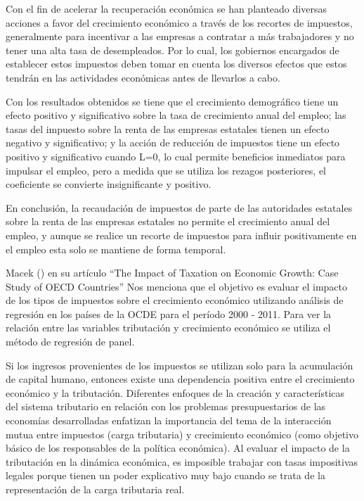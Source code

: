 \documentclass[
  jou,
  floatsintext,
  longtable,
  a4paper,
  nolmodern,
  notxfonts,
  notimes,
  12pt,
  colorlinks=true,linkcolor=blue,citecolor=blue,urlcolor=blue]{apa7}
\begin{document}
Con el fin de acelerar la recuperación económica se han planteado
diversas acciones a favor del crecimiento económico a través de los
recortes de impuestos, generalmente para incentivar a las empresas a
contratar a más trabajadores y no tener una alta tasa de desempleados.
Por lo cual, los gobiernos encargados de establecer estos impuestos
deben tomar en cuenta los diversos efectos que estos tendrán en las
actividades económicas antes de llevarlos a cabo.

Con los resultados obtenidos se tiene que el crecimiento demográfico
tiene un efecto positivo y significativo sobre la tasa de crecimiento
anual del empleo; las tasas del impuesto sobre la renta de las empresas
estatales tienen un efecto negativo y significativo; y la acción de
reducción de impuestos tiene un efecto positivo y significativo cuando
L=0, lo cual permite beneficios inmediatos para impulsar el empleo, pero
a medida que se utiliza los rezagos posteriores, el coeficiente se
convierte insignificante y positivo.

En conclusión, la recaudación de impuestos de parte de las autoridades
estatales sobre la renta de las empresas estatales no permite el
crecimiento anual del empleo, y aunque se realice un recorte de
impuestos para influir positivamente en el empleo esta solo se mantiene
de forma temporal.

Macek () en su artículo ``The
Impact of Taxation on Economic Growth: Case Study of OECD Countries''
Nos menciona que el objetivo es evaluar el impacto de los tipos de
impuestos sobre el crecimiento económico utilizando análisis de
regresión en los países de la OCDE para el período 2000 - 2011. Para ver
la relación entre las variables tributación y crecimiento económico se
utiliza el método de regresión de panel.

Si los ingresos provenientes de los impuestos se utilizan solo para la
acumulación de capital humano, entonces existe una dependencia positiva
entre el crecimiento económico y la tributación. Diferentes enfoques de
la creación y características del sistema tributario en relación con los
problemas presupuestarios de las economías desarrolladas enfatizan la
importancia del tema de la interacción mutua entre impuestos (carga
tributaria) y crecimiento económico (como objetivo básico de los
responsables de la política económica). Al evaluar el impacto de la
tributación en la dinámica económica, es imposible trabajar con tasas
impositivas legales porque tienen un poder explicativo muy bajo cuando
se trata de la representación de la carga tributaria real.
\end{document}
